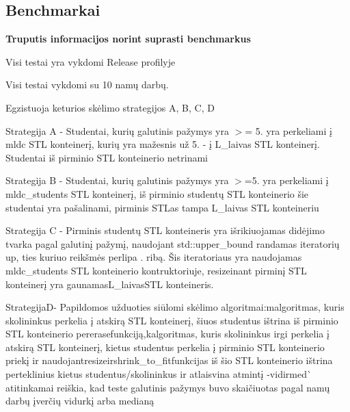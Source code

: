 \subsection*{Benchmark\textquotesingle{}ai}

{\bfseries{Truputis informacijos norint suprasti benchmarkus}}
\begin{DoxyItemize}
\item Visi testai yra vykdomi Release profilyje
\item Visi testai vykdomi su 10 namų darbų.
\item Egzistuoja keturios skėlimo strategijos {\ttfamily A, B, C, D}
\item Strategija {\ttfamily A} -\/ Studentai, kurių galutinis pažymys yra $>$= 5. yra perkeliami į {\ttfamily mldc} S\+TL konteinerį, kurių yra mažesnis už 5. -\/ į {\ttfamily L\+\_\+laivas} S\+TL konteinerį. Studentai iš pirminio S\+TL konteinerio netrinami
\item Strategija {\ttfamily B} -\/ Studentai, kurių galutinis pažymys yra $>$=5. yra perkeliami į {\ttfamily mldc\+\_\+students} S\+TL konteinerį, iš pirminio studentų S\+TL konteinerio šie studentai yra pašalinami, pirminis S\+TL\textquotesingle{}as tampa {\ttfamily L\+\_\+laivas} S\+TL konteineriu
\item Strategija {\ttfamily C} -\/ Pirminis studentų S\+TL konteineris yra išrikiuojamas didėjimo tvarka pagal galutinį pažymį, naudojant {\ttfamily std\+::upper\+\_\+bound} randamas iteratorių {\ttfamily up}, ties kuriuo reikšmės perlipa {.} ribą. Šis iteratoriaus yra naudojamas {\ttfamily mldc\+\_\+students} S\+TL konteinerio kontruktoriuje, resize{\ttfamily inant pirminį S\+TL konteinerį yra gaunamas}{\ttfamily L\+\_\+laivas}{\ttfamily S\+TL konteineris.}
\item {\ttfamily Strategija}{\ttfamily D}{\ttfamily -\/ Papildomos užduoties siūlomi skėlimo algoritmai\+:}{\ttfamily m}{\ttfamily algoritmas, kuris skolininkus perkelia į atskirą S\+TL konteinerį, šiuos studentus ištrina iš pirminio S\+TL konteinerio per}{\ttfamily erase}{\ttfamily funkciją,}{\ttfamily k}{\ttfamily algoritmas, kuris skolininkus irgi perkelia į atskirą S\+TL konteinerį, kietus studentus perkelia į pirminio S\+TL konteinerio priekį ir naudojant}{\ttfamily resize}{\ttfamily ir}{\ttfamily shrink\+\_\+to\+\_\+fit}{\ttfamily funkcijas iš šio S\+TL konteinerio ištrina perteklinius kietus studentus/skolininkus ir atlaisvina atmintį -\/}{\ttfamily vid}{\ttfamily ir}{\ttfamily med}\`{} atitinkamai reiškia, kad teste galutinis pažymys buvo skaičiuotas pagal namų darbų įverčių vidurkį arba medianą
\end{DoxyItemize}

